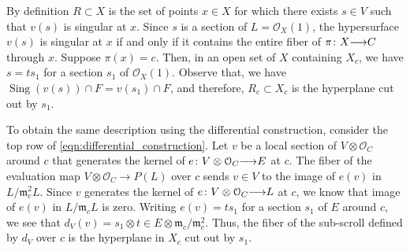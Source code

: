 \documentclass[11pt,reqno]{amsart}
\theoremstyle{plain}
\theoremstyle{definition}
\theoremstyle{remark}
\numberwithin{equation}{section}
\DeclareMathOperator{\sing}{Sing}
\renewcommand{\to}{{\longrightarrow}}
\numberwithin{equation}{section}
\renewcommand{\O}{\mathcal O}
\begin{document}
By definition $R \subset X$ is the set of points $x \in X$ for which there exists $s \in V$ such that $v(s)$ is singular at $x$.
Since $s$ is a section of $L = \O_X(1)$, the hypersurface $v(s)$ is singular at $x$ if and only if it contains the entire fiber of $\pi \from X \to C$ through $x$.
Suppose $\pi (x) = c$.
Then, in an open set of $X$ containing $X_c$, we have $s = t s_1$ for a section $s_1$ of $\O_X(1)$.
Observe that, we have $\sing(v(s)) \cap F = v(s_1) \cap F$, and therefore, $R_c \subset X_c$ is the hyperplane cut out by $s_1$.

To obtain the same description using the differential construction, consider the top row of \eqref{eqn:differential_construction}.
Let $v$ be a local section of $V \otimes \O_C$ around $c$ that generates the kernel of $e \from V \otimes \O_C \to E$ at $c$.
The fiber of the evaluation map $V \otimes \O_C \to P(L)$ over $c$ sends $v \in V$ to the image of $e(v)$ in $L / \mathfrak m_c^2 L$.
Since $v$ generates the kernel of $e \from V \otimes \O_C \to L$ at $c$, we know that image of $e(v)$ in $L/ \mathfrak m_cL$ is zero.
Writing $e(v) = ts_1$ for a section $s_1$ of $E$ around $c$, we see that $d_V(v) = s_1 \otimes t \in E \otimes \mathfrak m_c/\mathfrak m_c^2$.
Thus, the fiber of the sub-scroll defined by $d_V$ over $c$ is the hyperplane in $X_c$ cut out by $s_1$.
\end{document}

